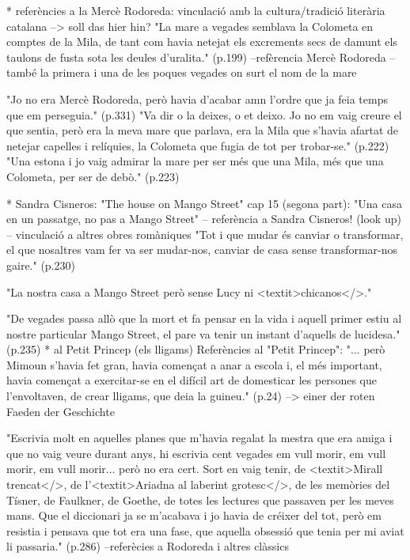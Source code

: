 * referències a la Mercè Rodoreda: vinculació amb la cultura/tradició literària catalana --> soll das hier hin?
"La mare a vegades semblava la Colometa en comptes de la Mila, de tant com havia netejat els excrements secs de damunt els taulons de fusta sota les deules d'uralita." (p.199)
--refèrencia Mercè Rodoreda
--també la primera i una de les poques vegades on surt el nom de la mare

"Jo no era Mercè Rodoreda, però havia d'acabar amn l'ordre que ja feia temps que em perseguia." (p.331)
"Va dir o la deixes, o et deixo. Jo no em vaig creure el que sentia, però era la meva mare que parlava, era la Mila que s'havia afartat de netejar capelles i relíquies, la Colometa que fugia de tot per trobar-se." (p.222)
"Una estona i jo vaig admirar la mare per ser més que una Mila, més que una Colometa, per ser de debò." (p.223)

* Sandra Cisneros: "The house on Mango Street"
cap 15 (segona part): "Una casa en un passatge, no pas a Mango Street"
-- referència a Sandra Cisneros! (look up)
-- vinculació a altres obres romàniques
"Tot i que mudar és canviar o transformar, el que nosaltres vam fer va ser mudar-nos, canviar de casa sense transformar-nos gaire." (p.230)

"La nostra casa a Mango Street però sense Lucy ni <textit>chicanos</>."

"De vegades passa allò que la mort et fa pensar en la vida i aquell primer estiu al nostre particular Mango Street, el pare va tenir un instant d'aquells de lucidesa."(p.235)
* al Petit Princep (els lligams)
Referències al "Petit Princep":
"... però Mimoun s'havia fet gran, havia començat a anar a escola i, el més important, havia començat a exercitar-se en el difícil art de domesticar les persones que l'envoltaven, de crear lligams, que deia la guineu." (p.24)
--> einer der roten Faeden der Geschichte

"Escrivia molt en aquelles planes que m'havia regalat la mestra que era amiga i que no vaig veure durant anys, hi escrivia cent vegades em vull morir, em vull morir, em vull morir... però no era cert. Sort en vaig tenir, de <textit>Mirall trencat</>, de l'<textit>Ariadna al laberint grotesc</>, de les memòries del Tísner, de Faulkner, de Goethe, de totes les lectures que passaven per les meves mans. Que el diccionari ja se m'acabava i jo havia de créixer del tot, però em resistia i pensava que tot era una fase, que aquella obsessió que tenia per mi aviat li passaria." (p.286)
--referècies a Rodoreda i altres clàssics

